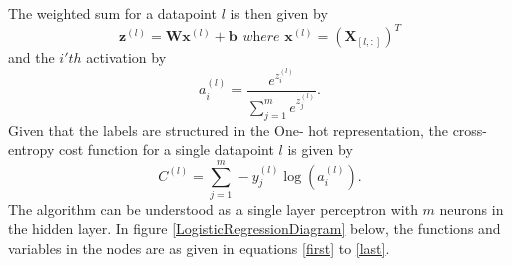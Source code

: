 \documentclass[11pt,a4paper,titlepage]{article}
\begin{document}
The weighted sum for a datapoint $l$ is then given by 
\begin{equation}
\textbf{z}^{(l)} = \textbf{W}\textbf{x}^{(l)}+\textbf{b} \textit{ where }\textbf{x}^{(l)}=(\textbf{X}_{[l,:]})^T
\end{equation}
and the $i'th$ activation by
\begin{equation}\label{softmax}
a_i^{(l)} = \frac{e^{z_i^{(l)}}}{\sum_{j=1}^{m} e^{z_j^{(l)}}}.
\end{equation}
Given that the labels are structured in the One- hot representation, the cross- entropy cost function for a single datapoint $l$ is given by
\begin{equation}\label{last}
C^{(l)} = \sum\limits_{j=1}^{m} -y_j^{(l)}\log(a_i^{(l)}).
\end{equation}
The algorithm can be understood as a single layer perceptron with $m$ neurons in the hidden layer. In figure \ref{LogisticRegressionDiagram} below, the functions and variables in the nodes are as given in equations \eqref{first} to \eqref{last}.
\end{document}
